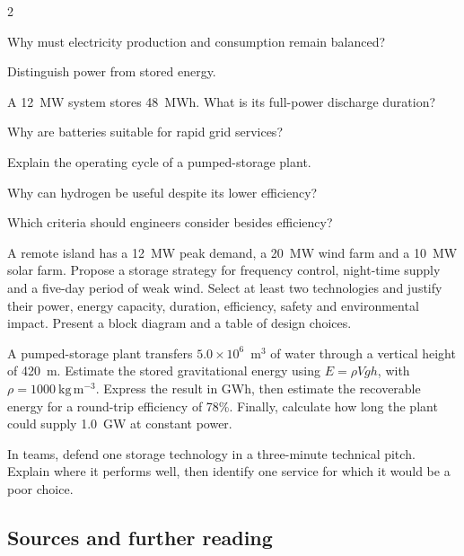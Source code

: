 \begin{multicols}{2}
\begin{questions}
\item Why must electricity production and consumption remain balanced?
\item Distinguish power from stored energy.
\item A 12~MW system stores 48~MWh. What is its full-power discharge duration?
\item Why are batteries suitable for rapid grid services?
\item Explain the operating cycle of a pumped-storage plant.
\item Why can hydrogen be useful despite its lower efficiency?
\item Which criteria should engineers consider besides efficiency?
\end{questions}

\begin{challenge}
A remote island has a 12~MW peak demand, a 20~MW wind farm and a 10~MW solar farm.
Propose a storage strategy for frequency control, night-time supply and a five-day period of
weak wind. Select at least two technologies and justify their power, energy capacity,
duration, efficiency, safety and environmental impact. Present a block diagram and a table
of design choices.
\end{challenge}

\begin{applicationexercise}
A pumped-storage plant transfers $5.0\times10^6$~m$^3$ of water through a vertical height of
420~m. Estimate the stored gravitational energy using $E=\rho Vgh$, with
$\rho=1000~\mathrm{kg\,m^{-3}}$. Express the result in GWh, then estimate the recoverable
energy for a round-trip efficiency of 78\%. Finally, calculate how long the plant could
supply 1.0~GW at constant power.
\end{applicationexercise}

\begin{speaking}
In teams, defend one storage technology in a three-minute technical pitch. Explain where it
performs well, then identify one service for which it would be a poor choice.
\end{speaking}

\end{multicols}

\subsection*{Sources and further reading}
\quad
{}
